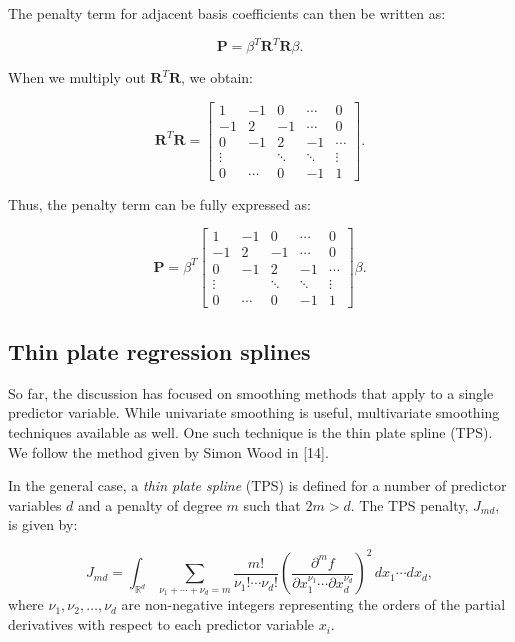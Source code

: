 \documentclass[
11pt, %
oneside, %
english, %
singlespacing, %
]{macthesis} %
\begin{document}
The penalty term for adjacent basis coefficients can then be written as:

\[
\mathbf{P} = \beta^T \mathbf{R}^T \mathbf{R} \beta.
\]

When we multiply out \(\mathbf{R}^T \mathbf{R}\), we obtain:

\[
\mathbf{R}^T \mathbf{R} = \begin{bmatrix}
1 & -1 & 0 & \cdots & 0 \\
-1 & 2 & -1 & \cdots & 0 \\
0 & -1 & 2 & -1 & \cdots \\
\vdots & & \ddots & \ddots & \vdots \\
0 & \cdots & 0 & -1 & 1 
\end{bmatrix}.
\]

Thus, the penalty term can be fully expressed as:

\[
\mathbf{P} = \beta^T
\begin{bmatrix}
1 & -1 & 0 & \cdots & 0 \\
-1 & 2 & -1 & \cdots & 0 \\
0 & -1 & 2 & -1 & \cdots \\
\vdots & & \ddots & \ddots & \vdots \\
0 & \cdots & 0 & -1 & 1 
\end{bmatrix}
\beta.
\]

\subsection{Thin plate regression splines}\label{Thin-plate-regression-splines}

So far, the discussion has focused on smoothing methods that apply to a single predictor variable. While univariate smoothing is useful, multivariate smoothing techniques available as well. One such technique is the thin plate spline (TPS). We follow the method given by Simon Wood in {[}14{]}.

In the general case, a \emph{thin plate spline} (TPS) is defined for a number of predictor variables \(d\) and a penalty of degree \(m\) such that \(2m > d\). The TPS penalty, \(J_{md}\), is given by:

\[
J_{md} = \int_{\mathbb{R}^d} \sum_{\nu_1 + \cdots + \nu_d = m} \frac{m!}{\nu_1! \cdots \nu_d!} \left( \frac{\partial^m f}{\partial x_1^{\nu_1} \cdots \partial x_d^{\nu_d}} \right)^2 \, dx_1 \cdots dx_d,
\]
where \(\nu_1, \nu_2, \ldots, \nu_d\) are non-negative integers representing the orders of the partial derivatives with respect to each predictor variable \(x_i\).
\end{document}
